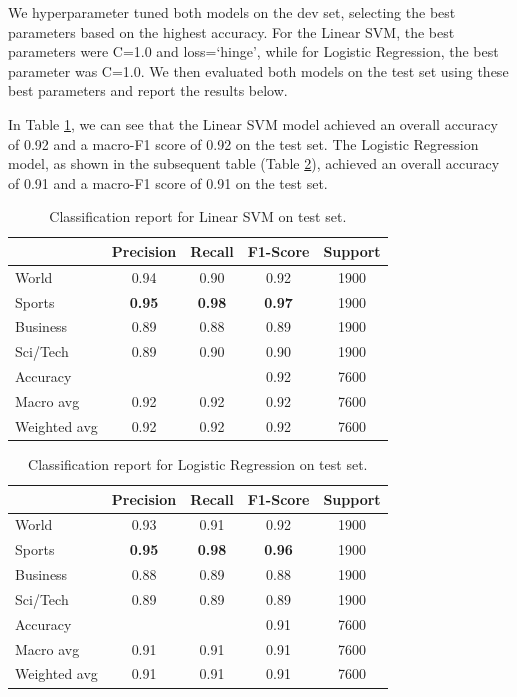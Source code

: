 We hyperparameter tuned both models on the dev set, selecting the best parameters based on the highest accuracy. For the Linear SVM, the best parameters were C=1.0 and loss=`hinge', while for Logistic Regression, the best parameter was C=1.0. We then evaluated both models on the test set using these best parameters and report the results below.

In Table \ref{tab:linear_svm_test_classification_report}, we can see that the Linear SVM model achieved an overall accuracy of 0.92 and a macro-F1 score of 0.92 on the test set. The Logistic Regression model, as shown in the subsequent table (Table \ref{tab:logistic_regression_test_classification_report}), achieved an overall accuracy of 0.91 and a macro-F1 score of 0.91 on the test set.

\begin{table}[h]
\centering
\begin{tabular}{lcccc}
\toprule
 & \textbf{Precision} & \textbf{Recall} & \textbf{F1-Score} & \textbf{Support} \\
\midrule
World            & 0.94 & 0.90 & 0.92 & 1900 \\
Sports            & \textbf{0.95} & \textbf{0.98} & \textbf{0.97} & 1900 \\
Business            & 0.89 & 0.88 & 0.89 & 1900 \\
Sci/Tech            & 0.89 & 0.90 & 0.90 & 1900 \\
\midrule
Accuracy     & \multicolumn{2}{c}{} & 0.92 & 7600 \\
Macro avg    & 0.92 & 0.92 & 0.92 & 7600 \\
Weighted avg & 0.92 & 0.92 & 0.92 & 7600 \\
\bottomrule
\end{tabular}
\caption{Classification report for Linear SVM on test set.}
\label{tab:linear_svm_test_classification_report}
\end{table}



\begin{table}[h]
\centering
\begin{tabular}{lcccc}
\toprule
 & \textbf{Precision} & \textbf{Recall} & \textbf{F1-Score} & \textbf{Support} \\
\midrule
World            & 0.93 & 0.91 & 0.92 & 1900 \\
Sports            & \textbf{0.95} & \textbf{0.98} & \textbf{0.96} & 1900 \\
Business            & 0.88 & 0.89 & 0.88 & 1900 \\
Sci/Tech            & 0.89 & 0.89 & 0.89 & 1900 \\
\midrule
Accuracy     & \multicolumn{2}{c}{} & 0.91 & 7600 \\
Macro avg    & 0.91 & 0.91 & 0.91 & 7600 \\
Weighted avg & 0.91 & 0.91 & 0.91 & 7600 \\
\bottomrule
\end{tabular}
\caption{Classification report for Logistic Regression on test set.}
\label{tab:logistic_regression_test_classification_report}
\end{table}


